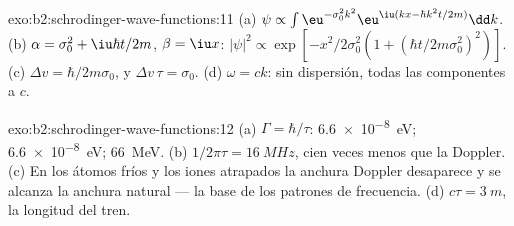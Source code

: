 \begin{solution}{exo:b2:schrodinger-wave-functions:11}
(a) $\psi \propto \int\eu^{-\sigma_0^2k^2}\eu^{\iu(kx - \hbar k^2t/2m)}\dd k$. (b) $\alpha =
\sigma_0^2 + \iu\hbar t/2m$, $\beta = \iu x$: $|\psi|^2 \propto \exp[-x^2/2\sigma_0^2(1 +
(\hbar t/2m\sigma_0^2)^2)]$. (c) $\Delta v = \hbar/2m\sigma_0$, y $\Delta v\,\tau =
\sigma_0$. (d) $\omega = ck$: sin dispersión, todas las componentes a $c$.
\end{solution}

\begin{solution}{exo:b2:schrodinger-wave-functions:12}
(a) $\Gamma = \hbar/\tau$: \qty{6.6e-8}{eV}; \qty{6.6e-8}{eV}; \qty{66}{MeV}. (b)
$1/2\pi\tau = \qty{16}{MHz}$, cien veces menos que la Doppler. (c) En
los átomos fríos y los iones atrapados la anchura Doppler desaparece y se alcanza la
anchura natural --- la base de los patrones de frecuencia. (d) $c\tau =
\qty{3}{m}$, la longitud del tren.
\end{solution}

